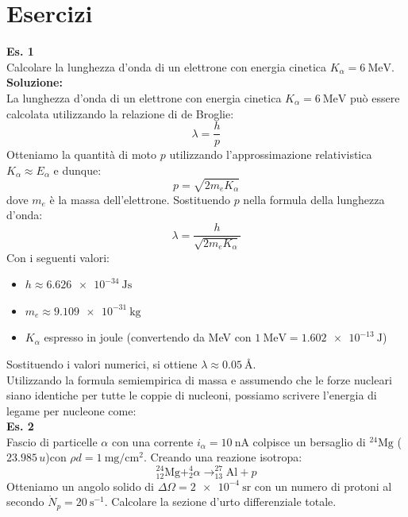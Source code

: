\chapter{Esercizi}
\textbf{Es. 1}\\
Calcolare la lunghezza d'onda di un elettrone con energia cinetica $K_\alpha = \qty{6}{\mega\electronvolt}$.\\
\textbf{Soluzione:}\\
La lunghezza d'onda di un elettrone con energia cinetica $K_\alpha = \qty{6}{\mega\electronvolt}$ può essere calcolata utilizzando la relazione di de Broglie:
\begin{equation}
\lambda = \frac{h}{p}
\end{equation}
Otteniamo la quantità di moto $p$ utilizzando l'approssimazione relativistica $K_\alpha \approx E_\alpha$ e dunque:
\begin{equation}
p = \sqrt{2m_e K_\alpha}
\end{equation}
dove $m_e$ è la massa dell'elettrone. Sostituendo $p$ nella formula della lunghezza d'onda:
\begin{equation}
\lambda = \frac{h}{\sqrt{2m_e K_\alpha}}
\end{equation}
Con i seguenti valori:
\begin{itemize}
 \item $h \approx \qty{6.626e-34}{\joule\second}$
 \item $m_e \approx \qty{9.109e-31}{\kilo\gram}$
 \item $K_\alpha$ espresso in joule (convertendo da MeV con $\qty{1}{\mega\electronvolt} = \qty{1.602e-13}{\joule}$)
\end{itemize}
Sostituendo i valori numerici, si ottiene $\lambda \approx \qty{0.05}{\angstrom}$.\\
Utilizzando la formula semiempirica di massa e assumendo che le forze nucleari siano identiche per tutte le coppie di
nucleoni, possiamo scrivere l'energia di legame per nucleone come:\\
\textbf{Es. 2}\\
Fascio di particelle $\alpha$ con una corrente $i_\alpha = \qty{10}{\nano\ampere}$ colpisce un bersaglio di $^{24}\text{Mg}$ ($23.985 \,u$)con $\rho d = \qty{1}{\milli\gram\per\centi\meter^2}$. Creando una reazione isotropa:
\begin{equation}
^{24}_{12}\text{Mg} + ^4_2\alpha \rightarrow ^{27}_{13}\text{Al} + p
\end{equation}
Otteniamo un angolo solido di $\Delta \Omega = \qty{2e-4}{\steradian}$ con un numero di protoni al secondo $\dot{N}_p = \qty{20}{\second^{-1}}$. Calcolare la sezione d'urto differenziale totale.\\
